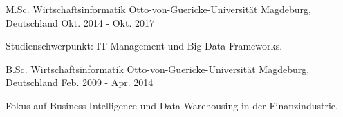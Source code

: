 

\begin{cventries}

     
   
   \cventry
    {M.Sc. Wirtschaftsinformatik} %
    {Otto-von-Guericke-Universität} %
    {Magdeburg, Deutschland} %
    {Okt. 2014 - Okt. 2017} %
    {
      \begin{cvitems} %
          \item{Studienschwerpunkt: IT-Management und Big Data Frameworks.}
      \end{cvitems}
    }
    
    \vspace{2mm}
   \cventry
    {B.Sc. Wirtschaftsinformatik} %
    {Otto-von-Guericke-Universität} %
    {Magdeburg, Deutschland} %
    {Feb. 2009 - Apr. 2014} %
    {
      \begin{cvitems} %
          \item{Fokus auf Business Intelligence und Data Warehousing in der Finanzindustrie.}
      \end{cvitems}
    }
\end{cventries}

